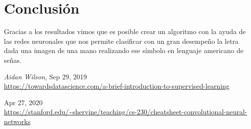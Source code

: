 \documentclass[12pt, fleqn]{report}                             %
\theoremstyle{break}                                            %
\begin{document}
        \section{Conclusión}

        Gracias a los resultados vimos que es posible crear un algoritmo con la ayuda de las redes neuronales
        que nos permite clasificar con un gran desempeño la letra dada una imagen de una mano realizando ese símbolo
        en lenguaje americano de señas.


\begin{thebibliography}{10}

      \textit{Aidan Wilson}, 
      Sep 29, 2019 \\
      \url{https://towardsdatascience.com/a-brief-introduction-to-supervised-learning}

      Apr 27, 2020 \\
      \url{https://stanford.edu/~shervine/teaching/cs-230/cheatsheet-convolutional-neural-networks}


\end{thebibliography}
\end{document}

